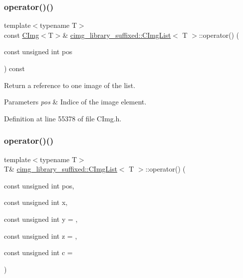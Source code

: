 \subsubsection{\texorpdfstring{operator()()}{operator()()}\hspace{0.1cm}{\footnotesize\ttfamily [2/3]}}
{\footnotesize\ttfamily template$<$typename T$>$ \\
const \hyperlink{structcimg__library__suffixed_1_1CImg}{C\+Img}$<$T$>$\& \hyperlink{structcimg__library__suffixed_1_1CImgList}{cimg\+\_\+library\+\_\+suffixed\+::\+C\+Img\+List}$<$ T $>$\+::operator() (\begin{DoxyParamCaption}\item[{const unsigned int}]{pos }\end{DoxyParamCaption}) const\hspace{0.3cm}{\ttfamily [inline]}}



Return a reference to one image of the list. 


\begin{DoxyParams}{Parameters}
{\em pos} & Indice of the image element. \\
\hline
\end{DoxyParams}


Definition at line 55378 of file C\+Img.\+h.

\mbox{\label{structcimg__library__suffixed_1_1CImgList_af23126de5ab40bf16fc361202909d33b}} 
\subsubsection{\texorpdfstring{operator()()}{operator()()}\hspace{0.1cm}{\footnotesize\ttfamily [3/3]}}
{\footnotesize\ttfamily template$<$typename T$>$ \\
T\& \hyperlink{structcimg__library__suffixed_1_1CImgList}{cimg\+\_\+library\+\_\+suffixed\+::\+C\+Img\+List}$<$ T $>$\+::operator() (\begin{DoxyParamCaption}\item[{const unsigned int}]{pos,  }\item[{const unsigned int}]{x,  }\item[{const unsigned int}]{y = {},  }\item[{const unsigned int}]{z = {},  }\item[{const unsigned int}]{c = {} }\end{DoxyParamCaption})\hspace{0.3cm}{\ttfamily [inline]}}



